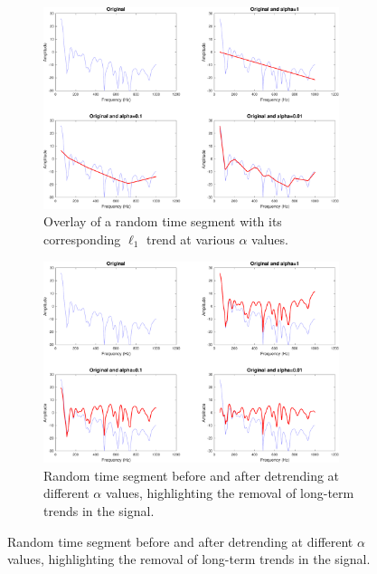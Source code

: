 \begin{figure}[htbp]
    \centering
    \begin{subfigure}[t]{\textwidth}
        \centering
        \includegraphics[width=0.95\textwidth]{img/ch5/example_l1_plots/segment_l1_trend.pdf}
        \caption{Overlay of a random time segment with its corresponding $\ell_1$ trend at various $\alpha$ values.}
        \label{fig:l1:segment-trend}
    \end{subfigure}
    
    \vspace{1cm}
    
    \begin{subfigure}[t]{\textwidth}
        \centering
        \includegraphics[width=0.95\textwidth]{img/ch5/example_l1_plots/segment_detrended.pdf}
        \caption{Random time segment before and after detrending at different $\alpha$ values, highlighting the removal of long-term trends in the signal.}
        \label{fig:l1:segment-detrended}
    \end{subfigure}
\end{figure}

